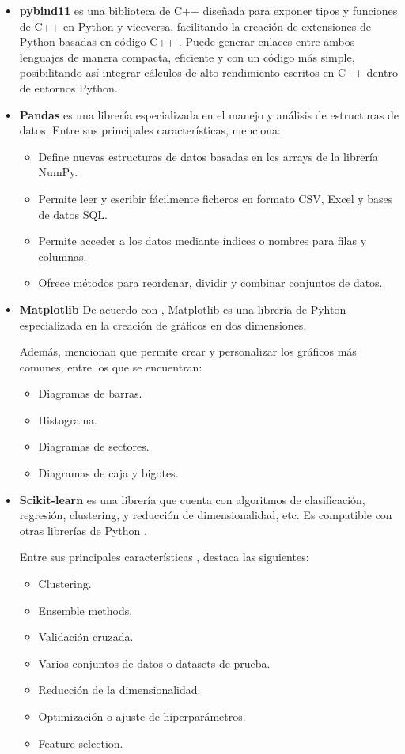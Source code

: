 \begin{itemize}
	\item \textbf{pybind11} es una biblioteca de C++ diseñada para exponer tipos y funciones de C++ en Python y viceversa, facilitando la creación de extensiones de Python basadas en código C++ \cite{pybind11}. Puede generar enlaces entre ambos lenguajes de manera compacta, eficiente y con un código más simple, posibilitando así integrar cálculos de alto rendimiento escritos en C++ dentro de entornos Python.
	
	\item\textbf{Pandas} es una librería especializada en el manejo y análisis de estructuras de datos. Entre sus principales características, \cite{alfaro_pandas} menciona:
	
	\begin{itemize}
		\item Define nuevas estructuras de datos basadas en los arrays de la librería NumPy.
		\item Permite leer y escribir fácilmente ficheros en formato CSV, Excel y bases de datos SQL.
		\item Permite acceder a los datos mediante índices o nombres para filas y columnas.
		\item Ofrece métodos para reordenar, dividir y combinar conjuntos de datos.
	\end{itemize}
	
	\item\textbf{Matplotlib} De acuerdo con \cite{alferez_matplotlib}, Matplotlib es una librería de Pyhton especializada en la creación de gráficos en dos dimensiones.
	
	Además, mencionan que permite crear y personalizar los gráficos más comunes, entre los que se encuentran:
	
	\begin{itemize}
		\item Diagramas de barras.
		\item Histograma.
		\item Diagramas de sectores.
		\item Diagramas de caja y bigotes.
	\end{itemize}
	
	\item\textbf{Scikit-learn} es una librería que cuenta con algoritmos de clasificación, regresión, clustering, y reducción de dimensionalidad, etc. Es compatible con otras librerías de Python \cite{mds_scikitlearn}.
	
	Entre sus principales características \cite{itop_scikitlearn}, destaca las siguientes:
	
	\begin{itemize}
		\item Clustering.
		\item Ensemble methods.
		\item Validación cruzada.
		\item Varios conjuntos de datos o datasets de prueba.
		\item Reducción de la dimensionalidad.
		\item Optimización o ajuste de hiperparámetros.
		\item Feature selection.
	\end{itemize}
	
\end{itemize}


